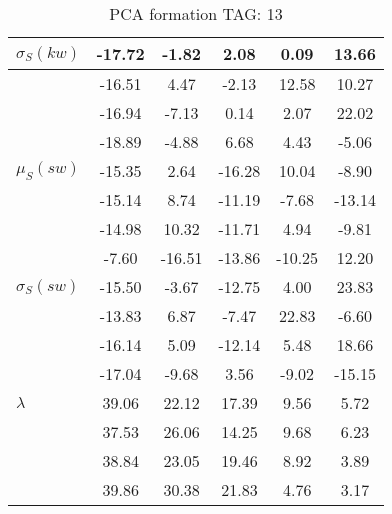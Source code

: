 \begin{table}[h!]
\begin{center}
\begin{tabular}{| l | c | c | c | c | c |}
$\sigma_S(kw)$ & -17.72  & -1.82  & 2.08  & 0.09  & 13.66 \\\hline
 & -16.51  & 4.47  & -2.13  & 12.58  & 10.27 \\\hline
 & -16.94  & -7.13  & 0.14  & 2.07  & 22.02 \\\hline
 & -18.89  & -4.88  & 6.68  & 4.43  & -5.06 \\\hline
$\mu_S(sw)$ & -15.35  & 2.64  & -16.28  & 10.04  & -8.90 \\\hline
 & -15.14  & 8.74  & -11.19  & -7.68  & -13.14 \\\hline
 & -14.98  & 10.32  & -11.71  & 4.94  & -9.81 \\\hline
 & -7.60  & -16.51  & -13.86  & -10.25  & 12.20 \\\hline
$\sigma_S(sw)$ & -15.50  & -3.67  & -12.75  & 4.00  & 23.83 \\\hline
 & -13.83  & 6.87  & -7.47  & 22.83  & -6.60 \\\hline
 & -16.14  & 5.09  & -12.14  & 5.48  & 18.66 \\\hline
 & -17.04  & -9.68  & 3.56  & -9.02  & -15.15 \\\hline
$\lambda$ & 39.06  & 22.12  & 17.39  & 9.56  & 5.72 \\\hline
 & 37.53  & 26.06  & 14.25  & 9.68  & 6.23 \\\hline
 & 38.84  & 23.05  & 19.46  & 8.92  & 3.89 \\\hline
 & 39.86  & 30.38  & 21.83  & 4.76  & 3.17 \\\hline
\end{tabular}
\caption{PCA formation TAG: 13}
\end{center}
\end{table}